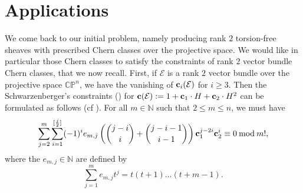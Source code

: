 \documentclass[a4paper,10pt]{amsart}
\theoremstyle{plain}{
    \newtheorem{theorem}{Theorem}[section]
    \newtheorem{lemma}[theorem]{Lemma}
    \newtheorem{corollary}[theorem]{Corollary}
    \newtheorem{proposition}[theorem]{Proposition}
    \newtheorem{conjecture}[theorem]{Conjecture}
}
\theoremstyle{definition}{
    \newtheorem{definition}[theorem]{Definition}
    \newtheorem{defn-thm}[theorem]{Definition-Theorem}
    \newtheorem{example}[theorem]{Example}
    \newtheorem{notation}[theorem]{Notation}
}
\theoremstyle{remark}{
    \newtheorem{remark}[theorem]{Remark}
    \newtheorem{problem}[theorem]{Problem}
    \newtheorem{question}[theorem]{Question}
}
\def\uc{{\bf c}}
\def\cE{\mathcal{E}}
\def\N{\mathbb{N}}
\def\P{\mathbb{P}}
\def\C{\mathbb{C}}
\begin{document}
\section{Applications}
\label{sec:applications}

We come back to our initial problem, namely producing rank $2$ torsion-free sheaves with prescribed Chern classes over the projective space. We would like in particular those Chern classes to satisfy the constraints of rank $2$ vector bundle Chern classes, that we now recall. First, if $\cE$ is a rank $2$ vector bundle over the projective space $\C\P^n$, we have the vanishing of $\uc_i(\cE)$ for $i\geq 3$. Then the Schwarzenberger's constraints (\cite[Appendix 1]{Hirz}) for $\uc(\cE):=1+\uc_1\cdot H+\uc_2\cdot H^2$ can be formulated as follows (cf \cite[Section 2]{HoSch}). For all $m\in\N$ such that $2\leq m\leq n$, we must have
\begin{equation}
 \label{eq:Schwarzenberger conditions}
  \sum_{j=2}^m\sum_{i=1}^{[\frac{j}{2}]} (-1)^i e_{m,j}\left( \binom{j-i}{i}+ \binom{j-i-1}{i-1}\right)\uc_1^{j-2i}\uc_2^i \equiv 0 \: \mathrm{ mod }\: m!,
\end{equation}
where the $e_{m,j}\in\N$ are defined by
$$
\sum_{j=1}^m e_{m,j}t^j=t(t+1)\ldots(t+m-1).
$$
\end{document}
